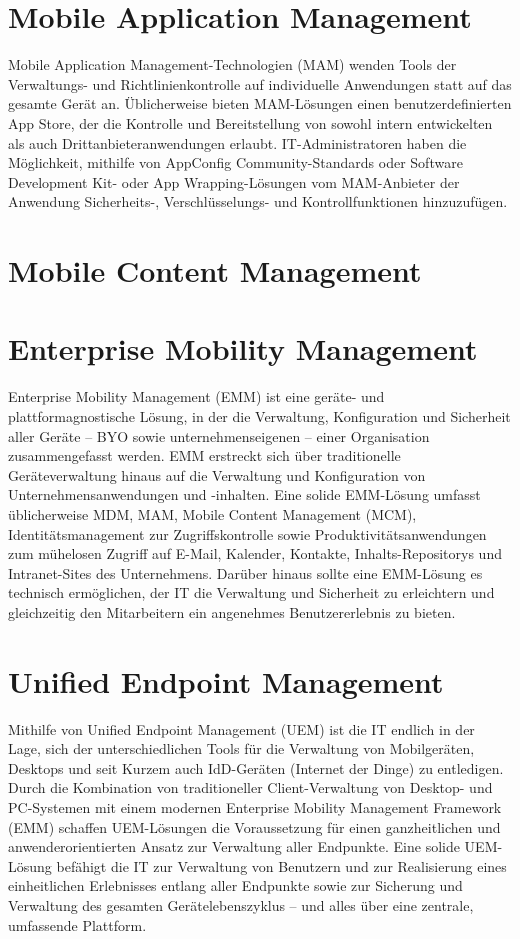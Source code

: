 \section{Mobile Application Management}
Mobile Application Management-Technologien (MAM) wenden Tools der Verwaltungs- und Richtlinienkontrolle auf individuelle Anwendungen statt auf das gesamte Gerät an. Üblicherweise bieten MAM-Lösungen einen benutzerdefinierten App Store, der die Kontrolle und Bereitstellung von sowohl intern entwickelten als auch Drittanbieteranwendungen erlaubt. IT-Administratoren haben die Möglichkeit, mithilfe von AppConfig Community-Standards oder Software Development Kit- oder App Wrapping-Lösungen vom MAM-Anbieter der Anwendung Sicherheits-, Verschlüsselungs- und Kontrollfunktionen hinzuzufügen. 

\section{Mobile Content Management}

\section{Enterprise Mobility Management}
Enterprise Mobility Management (EMM) ist eine geräte- und plattformagnostische Lösung, in der die Verwaltung, Konfiguration und Sicherheit aller Geräte – BYO sowie unternehmenseigenen – einer Organisation zusammengefasst werden. EMM erstreckt sich über traditionelle Geräteverwaltung hinaus auf die Verwaltung und Konfiguration von Unternehmensanwendungen und -inhalten.  Eine solide EMM-Lösung umfasst üblicherweise MDM, MAM, Mobile Content Management (MCM), Identitätsmanagement zur Zugriffskontrolle sowie Produktivitätsanwendungen zum mühelosen Zugriff auf E-Mail, Kalender, Kontakte, Inhalts-Repositorys und Intranet-Sites des Unternehmens. Darüber hinaus sollte eine EMM-Lösung es technisch ermöglichen, der IT die Verwaltung und Sicherheit zu erleichtern und gleichzeitig den Mitarbeitern ein angenehmes Benutzererlebnis zu bieten. 

\section{Unified Endpoint Management}
Mithilfe von Unified Endpoint Management (UEM) ist die IT endlich in der Lage, sich der unterschiedlichen Tools für die Verwaltung von Mobilgeräten, Desktops und seit Kurzem auch IdD-Geräten (Internet der Dinge) zu entledigen. Durch die Kombination von traditioneller Client-Verwaltung von Desktop- und PC-Systemen mit einem modernen Enterprise Mobility Management Framework (EMM) schaffen UEM-Lösungen die Voraussetzung für einen ganzheitlichen und anwenderorientierten Ansatz zur Verwaltung aller Endpunkte. Eine solide UEM-Lösung befähigt die IT zur Verwaltung von Benutzern und zur Realisierung eines einheitlichen Erlebnisses entlang aller Endpunkte sowie zur Sicherung und Verwaltung des gesamten Gerätelebenszyklus – und alles über eine zentrale, umfassende Plattform. 






